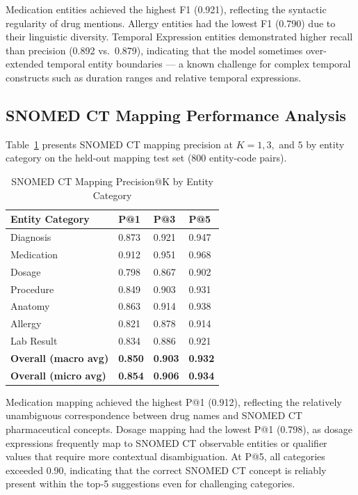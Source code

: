 Medication entities achieved the highest F1 (0.921), reflecting the syntactic regularity of drug mentions. Allergy entities had the lowest F1 (0.790) due to their linguistic diversity. Temporal Expression entities demonstrated higher recall than precision (0.892 vs.\ 0.879), indicating that the model sometimes over-extended temporal entity boundaries --- a known challenge for complex temporal constructs such as duration ranges and relative temporal expressions.

\subsection{SNOMED CT Mapping Performance Analysis}
Table~\ref{tab:snomed_precision} presents SNOMED CT mapping precision at $K = 1, 3,$ and $5$ by entity category on the held-out mapping test set (800 entity-code pairs).

\begin{table}[htbp]
\centering
\caption{SNOMED CT Mapping Precision@K by Entity Category}
\label{tab:snomed_precision}
\begin{tabular}{|p{4cm}|p{2.5cm}|p{2.5cm}|p{2.5cm}|}
\hline
\textbf{Entity Category} & \textbf{P@1} & \textbf{P@3} & \textbf{P@5} \\
\hline
Diagnosis & 0.873 & 0.921 & 0.947 \\
\hline
Medication & 0.912 & 0.951 & 0.968 \\
\hline
Dosage & 0.798 & 0.867 & 0.902 \\
\hline
Procedure & 0.849 & 0.903 & 0.931 \\
\hline
Anatomy & 0.863 & 0.914 & 0.938 \\
\hline
Allergy & 0.821 & 0.878 & 0.914 \\
\hline
Lab Result & 0.834 & 0.886 & 0.921 \\
\hline
\textbf{Overall (macro avg)} & \textbf{0.850} & \textbf{0.903} & \textbf{0.932} \\
\hline
\textbf{Overall (micro avg)} & \textbf{0.854} & \textbf{0.906} & \textbf{0.934} \\
\hline
\end{tabular}
\end{table}

Medication mapping achieved the highest P@1 (0.912), reflecting the relatively unambiguous correspondence between drug names and SNOMED CT pharmaceutical concepts. Dosage mapping had the lowest P@1 (0.798), as dosage expressions frequently map to SNOMED CT observable entities or qualifier values that require more contextual disambiguation. At P@5, all categories exceeded 0.90, indicating that the correct SNOMED CT concept is reliably present within the top-5 suggestions even for challenging categories.

